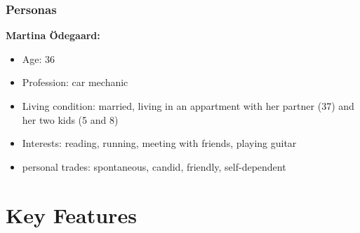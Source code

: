 \documentclass[aspectratio=169]{beamer}
\begin{document}
\begin{frame}   
	\frametitle{Personas}{\textbf{Martina Ödegaard:}}
	\begin{itemize}
		\item Age: 36
		\item Profession: car mechanic
		\item Living condition: married, living in an appartment with her partner (37) and her two kids (5 and 8)
		\item Interests: reading, running, meeting with friends, playing guitar 
		\item personal trades: spontaneous, candid, friendly, self-dependent
	\end{itemize}
\end{frame}






\section{Key Features}


\end{document}
